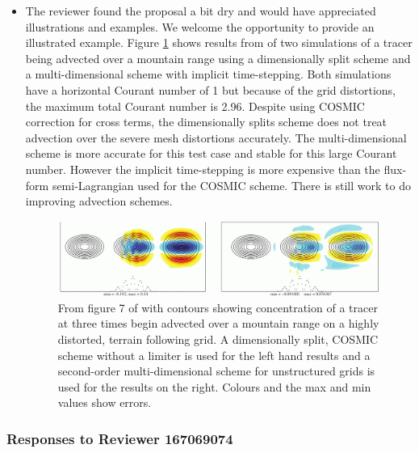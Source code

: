 \begin{itemize}
\item
The reviewer found the proposal a bit dry and would have appreciated illustrations and examples. We welcome the opportunity to provide an illustrated example. Figure \ref{fig:CWPS17_fig7} shows results from \cite{CWPS17} of two simulations of a tracer being advected over a mountain range using a dimensionally split scheme and a multi-dimensional scheme with implicit time-stepping. Both simulations have a horizontal Courant number of 1 but because of the grid distortions, the maximum total Courant number is 2.96. Despite using COSMIC correction for cross terms, the dimensionally splits scheme does not treat advection over the severe mesh distortions accurately. The multi-dimensional scheme is more accurate for this test case and stable for this large Courant number. However the implicit time-stepping is more expensive than the flux-form semi-Lagrangian used for the COSMIC scheme. There is still work to do improving advection schemes.

\begin{figure}
\includegraphics[width=\linewidth]{ChenFig7.png}
\caption{From figure 7 of \cite{CWPS17} with contours showing concentration of a tracer at three times begin advected over a mountain range on a highly distorted, terrain following grid. A dimensionally split, COSMIC scheme without a limiter is used for the left hand results and a second-order multi-dimensional scheme for unstructured grids is used for the results on the right. Colours and the max and min values show errors.}
\label{fig:CWPS17_fig7}
\end{figure}


\end{itemize}

\subsubsection*{Responses to Reviewer 167069074}

